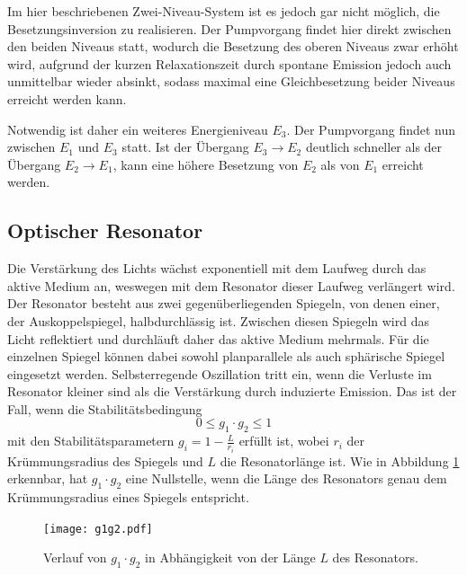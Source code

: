 Im hier beschriebenen Zwei-Niveau-System ist es jedoch gar nicht möglich, die Besetzungsinversion zu realisieren.
Der Pumpvorgang findet hier direkt zwischen den beiden Niveaus statt, wodurch die Besetzung des oberen Niveaus zwar erhöht wird,
aufgrund der kurzen Relaxationszeit durch spontane Emission jedoch auch unmittelbar wieder absinkt, sodass 
maximal eine Gleichbesetzung beider Niveaus erreicht werden kann.

Notwendig ist daher ein weiteres Energieniveau $E_3$. Der Pumpvorgang findet nun zwischen $E_1$ und $E_3$ statt.
Ist der Übergang $E_3 \rightarrow E_2$ deutlich schneller als der Übergang $E_2 \rightarrow E_1$, 
kann eine höhere Besetzung von $E_2$ als von $E_1$ erreicht werden.


\subsection*{Optischer Resonator}
Die Verstärkung des Lichts wächst exponentiell mit dem Laufweg durch das aktive Medium an, weswegen mit dem 
Resonator dieser Laufweg verlängert wird. Der Resonator besteht aus zwei gegenüberliegenden Spiegeln, von denen einer, der Auskoppelspiegel, 
halbdurchlässig ist. Zwischen diesen Spiegeln wird das Licht reflektiert und durchläuft daher das aktive Medium mehrmals.
Für die einzelnen Spiegel können dabei sowohl planparallele als auch sphärische Spiegel eingesetzt werden. 
Selbsterregende Oszillation tritt ein, wenn die Verluste im Resonator kleiner sind als die Verstärkung durch 
induzierte Emission. Das ist der Fall, wenn die Stabilitätsbedingung
\begin{equation}
    \label{eq:stabil}
    0 \leq g_1 \cdot g_2 \leq 1 
\end{equation}
mit den Stabilitätsparametern $g_i = 1 - \frac{L}{r_i}$ erfüllt ist, wobei $r_i$ der Krümmungsradius des Spiegels
und $L$ die Resonatorlänge ist.
Wie in Abbildung \ref{fig:tfig3} erkennbar, hat $g_1 \cdot g_2$ eine Nullstelle, wenn die Länge des Resonators
genau dem Krümmungsradius eines Spiegels entspricht.
\FloatBarrier
    \begin{figure}[h]
    \centering
    \texttt{[image: g1g2.pdf]}
    \caption{Verlauf von $g_1 \cdot g_2$ in Abhängigkeit von der Länge $L$ des Resonators.}
    \label{fig:tfig3}
    \end{figure}
\FloatBarrier
\noindent

